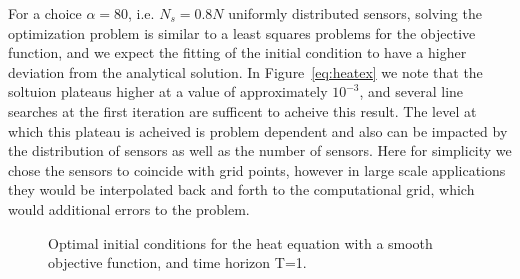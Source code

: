 \documentclass[10pt]{article}
\begin{document}
{For a choice $\alpha=80$, i.e. $N_s=0.8N$ uniformly distributed sensors, solving the optimization problem is similar to a least squares problems for the objective function, and we expect the fitting of the initial condition to have a higher deviation from the analytical solution. In Figure~\ref{eq:heatex} we note that the soltuion plateaus higher at a value of approximately $10^{-3}$, and several line searches at the first iteration are sufficent to acheive this result. The level at which this plateau is acheived is problem dependent and also can be impacted by the distribution of sensors as well as the number of sensors. Here for simplicity we chose the sensors to coincide with grid points, however in large scale applications they would be interpolated back and forth to the computational grid, which would additional errors to the problem.




\begin{figure}[!ht]
\centering
{}
\quad
{}
\caption{Optimal initial conditions for the heat equation with a smooth objective function, and time horizon T=1.}
\end{figure}



}
\end{document}
